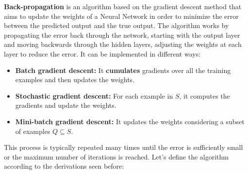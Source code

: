 \textbf{Back-propagation} is an algorithm based on the gradient descent method that aims to update the weights of a Neural Network in order to minimize the error between the predicted output and the true output. The algorithm works by propagating the error back through the network, starting with the output layer and moving backwards through the hidden layers, adjusting the weights at each layer to reduce the error. It can be implemented in different ways:
\begin{itemize}
    \item \textbf{Batch gradient descent:} It \textbf{cumulates} gradients over all the training examples and then updates the weights.
    \item \textbf{Stochastic gradient descent:} For each example in $S$, it computes the gradients and update the weights.
    \item \textbf{Mini-batch gradient descent:} It updates the weights considering a subset of examples $Q \subseteq S$. 
\end{itemize}
This process is typically repeated many times until the error is sufficiently small or the maximum number of iterations is reached. Let's define the algorithm according to the derivations seen before:

